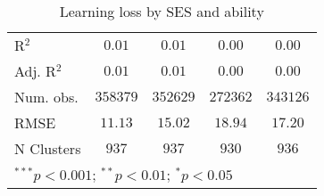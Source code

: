 \begin{table}
\begin{center}
\begin{tabular}{l c c c c}
\hline
R$^2$                                              & $0.01$        & $0.01$        & $0.00$        & $0.00$        \\
Adj. R$^2$                                         & $0.01$        & $0.01$        & $0.00$        & $0.00$        \\
Num. obs.                                          & $358379$      & $352629$      & $272362$      & $343126$      \\
RMSE                                               & $11.13$       & $15.02$       & $18.94$       & $17.20$       \\
N Clusters                                         & $937$         & $937$         & $930$         & $936$         \\
\hline
\multicolumn{5}{l}{\scriptsize{$^{***}p<0.001$; $^{**}p<0.01$; $^{*}p<0.05$}}
\end{tabular}
\caption{Learning loss by SES and ability}
\label{table_ses_ability}
\end{center}
\end{table}
